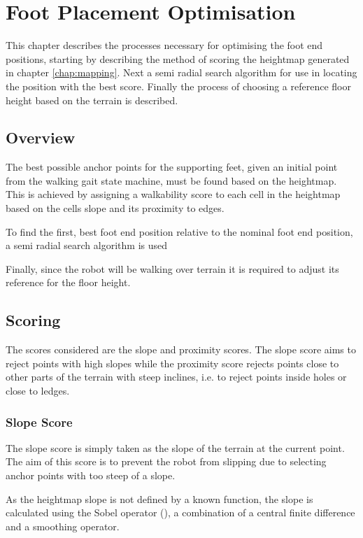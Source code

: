 \chapter{Foot Placement Optimisation} \label{chap:optimisation}
This chapter describes the processes necessary for optimising the foot end positions, starting by describing the method of scoring the heightmap generated in
chapter \ref{chap:mapping}. Next a semi radial search algorithm for use in locating the position with the best score. Finally the process of choosing a reference
floor height based on the terrain is described.
\section{Overview}
    The best possible anchor points for the supporting feet, given an initial point from the walking
    gait state machine, must be found based on the heightmap. This is achieved by assigning a walkability score to each cell in the heightmap based on the
    cells slope and its proximity to edges.

    To find the first, best foot end position relative to the nominal foot end position, a semi radial search algorithm is used

    Finally, since the robot will be walking over terrain it is required to adjust its reference for the floor height.

\section{Scoring} \label{sec:scores}
    The scores considered are the slope and proximity scores. The slope score aims to reject points with high slopes while the proximity score rejects points close
    to other parts of the terrain with steep inclines, i.e. to reject points inside holes or close to ledges.
    \subsection{Slope Score}
        The slope score is simply taken as the slope of the terrain at the current point. The aim of this score is to prevent the robot from slipping due to
        selecting anchor points with too steep of a slope.
        
        As the heightmap slope is not defined by a known function, the slope is calculated using the Sobel
        operator (\cite{sobel2014}), a combination of a central finite difference and a smoothing operator.

